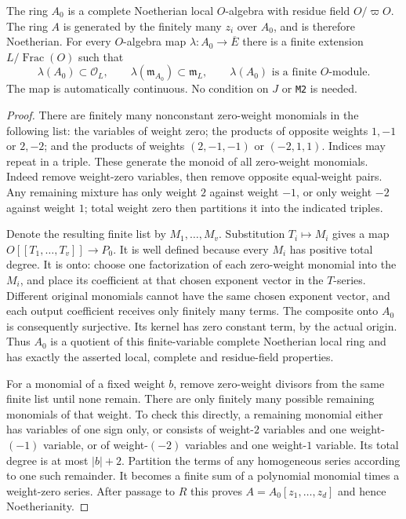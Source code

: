 \begin{lemma}
\label{AC-G58-algebra}
The ring $A_0$ is a complete Noetherian local
$O$-algebra with residue field $O/\varpi O$.
The ring $A$ is generated by the finitely many
$z_i$ over $A_0$, and is therefore Noetherian.
For every $O$-algebra map
$\lambda:A_0\to\overline E$ there is a finite
extension $L/\operatorname{Frac}(O)$ such that
\[
 \lambda(A_0)\subset\mathcal O_L,\qquad
 \lambda(\mathfrak m_{A_0})\subset\mathfrak m_L,
 \qquad \lambda(A_0)\text{ is a finite }O\text{-module}.
                                                               \tag{G58.1}
\]
The map is automatically continuous.
No condition on $J$ or \texttt{M2} is needed.
\end{lemma}
\begin{proof}
There are finitely many nonconstant zero-weight
monomials in the following list:
the variables of weight zero; the products of
opposite weights $1,-1$ or $2,-2$; and the products
of weights $(2,-1,-1)$ or $(-2,1,1)$.
Indices may repeat in a triple.
These generate the monoid of all zero-weight
monomials.  Indeed remove weight-zero variables,
then remove opposite equal-weight pairs.
Any remaining mixture has only weight $2$ against
weight $-1$, or only weight $-2$ against weight
$1$; total weight zero then partitions it into
the indicated triples.

Denote the resulting finite list by $M_1,\ldots,M_v$.
Substitution $T_i\mapsto M_i$ gives a map
$O[[T_1,\ldots,T_v]]\to P_0$.
It is well defined because every $M_i$ has positive
total degree.  It is onto: choose one factorization
of each zero-weight monomial into the $M_i$, and
place its coefficient at that chosen exponent
vector in the $T$-series.  Different original
monomials cannot have the same chosen exponent
vector, and each output coefficient receives only
finitely many terms.
The composite onto $A_0$ is consequently
surjective.  Its kernel has zero constant term,
by the actual origin.  Thus $A_0$ is a quotient
of this finite-variable complete Noetherian local
ring and has exactly the asserted local, complete
and residue-field properties.

For a monomial of a fixed weight $b$, remove
zero-weight divisors from the same finite list
until none remain.
There are only finitely many possible remaining
monomials of that weight.
To check this directly, a remaining monomial
either has variables of one sign only, or consists
of weight-$2$ variables and one weight-$(-1)$
variable, or of weight-$(-2)$ variables and one
weight-$1$ variable.
Its total degree is at most $|b|+2$.
Partition the terms of any homogeneous series
according to one such remainder.  It becomes a
finite sum of a polynomial monomial times a
weight-zero series.
After passage to $R$ this proves
$A=A_0[z_1,\ldots,z_d]$ and hence Noetherianity.


\end{proof}
